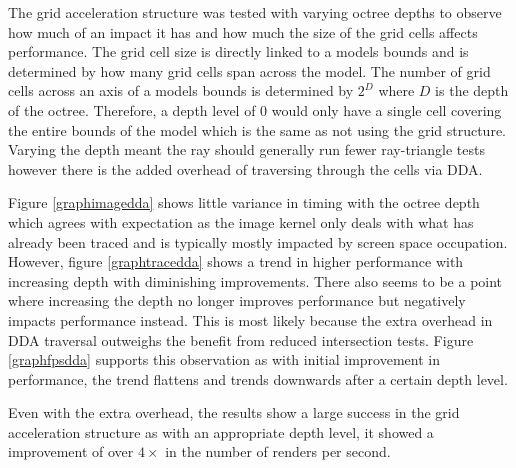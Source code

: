 \documentclass[final]{cmpreport}
\begin{document}
The grid acceleration structure was tested with varying octree depths to observe how much of an impact it has and how much the size of the grid cells affects performance. The grid cell size is directly linked to a models bounds and is determined by how many grid cells span across the model. The number of grid cells across an axis of a models bounds is determined by $2^D$ where $D$ is the depth of the octree. Therefore, a depth level of 0 would only have a single cell covering the entire bounds of the model which is the same as not using the grid structure. Varying the depth meant the ray should generally run fewer ray-triangle tests however there is the added overhead of traversing through the cells via DDA.

Figure \ref{graphimagedda} shows little variance in timing with the octree depth which agrees with expectation as the image kernel only deals with what has already been traced and is typically mostly impacted by screen space occupation. However, figure \ref{graphtracedda} shows a trend in higher performance with increasing depth with diminishing improvements. There also seems to be a point where increasing the depth no longer improves performance but negatively impacts performance instead. This is most likely because the extra overhead in DDA traversal outweighs the benefit from reduced intersection tests. Figure \ref{graphfpsdda} supports this observation as with initial improvement in performance, the trend flattens and trends downwards after a certain depth level.

Even with the extra overhead, the results show a large success in the grid acceleration structure as with an appropriate depth level, it showed a improvement of over $4\times$ in the number of renders per second.
\end{document}
